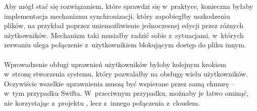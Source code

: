 Aby \cb{} mógł stać się rozwiązaniem, które sprawdzi się w~praktyce, konieczna
byłaby implementacja mechanizmu synchronizacji, który zapobiegłby uszkodzeniu
plików, na przykład poprzez uniemożliwienie jednoczesnej edycji przez różnych
użytkowników. Mechanizm taki musiałby radzić sobie z~sytuacjami, w~których
zerwaniu ulega połączenie z~użytkownikiem blokującym dostęp do pliku innym.

\paragraph{}

Wprowadzenie obługi uprawnień użytkowników byłoby kolejnym krokiem w~stronę
stworzenia systemu, który pozwalałby na obsługę wielu użytkowników. Oczywiście
wszelkie uprawnienia muszą być wspierane przez samą chmurę -- w~tym przypadku
Swifta. W~przeciwnym przypadku, możnaby je łatwo ominąć, nie korzystając
z~projektu \cb{}, lecz z~innego połączenia z~cloudem.





